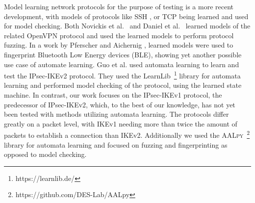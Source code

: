 Model learning network protocols for the purpose of testing is a more recent development, with models of protocols like SSH \parencite{fiteruau2017model}, or TCP \parencite{fiteruau2016combining} being learned and used for model checking. Both Novickis et al.~\parencite{novickis2016protocol} and Daniel et al.~\parencite{daniel2018inferring} learned models of the related OpenVPN protocol and used the learned models to perform protocol fuzzing. In a work by Pferscher and Aichernig \parencite{pferscher2021fingerprinting}, learned models were used to fingerprint Bluetooth Low Energy devices (BLE), showing yet another possible use case of automate learning. Guo et al. \parencite{guo2019model} used automata learning to learn and test the IPsec-IKEv2 protocol. They used the LearnLib~\footnote{https://learnlib.de/} library for automata learning and performed model checking of the protocol, using the learned state machine. In contrast, our work focuses on the IPsec-IKEv1 protocol, the predecessor of IPsec-IKEv2, which, to the best of our knowledge, has not yet been tested with methods utilizing automata learning. The protocols differ greatly on a packet level, with IKEv1 needing more than twice the amount of packets to establish a connection than IKEv2.
Additionally we used the \textsc{AALpy}~\footnote{https://github.com/DES-Lab/AALpy} library for automata learning and focused on fuzzing and fingerprinting as opposed to model checking.
